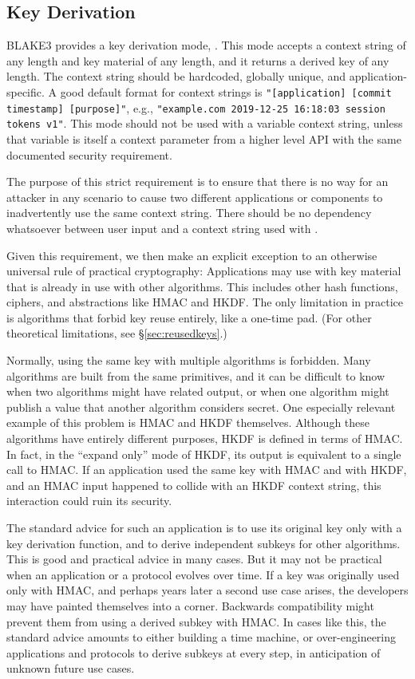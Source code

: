 \documentclass[11pt,notitlepage,a4paper]{article}
\newcommand{\flag}[1]{\texttt{\detokenize{#1}}\xspace}
\begin{document}
\subsection{Key Derivation}\label{sec:kdf}

BLAKE3 provides a key derivation mode, \flag{derive_key}. This mode accepts a
context string of any length and key material of any length, and it returns a
derived key of any length. The context string should be hardcoded, globally
unique, and application-specific. A good default format for context strings is
\texttt{"[application] [commit timestamp] [purpose]"}, e.g.,
\texttt{"example.com 2019-12-25 16:18:03 session tokens v1"}. This mode should
not be used with a variable context string, unless that variable is itself a
context parameter from a higher level API with the same documented security
requirement.

The purpose of this strict requirement is to ensure that there is no way for an
attacker in any scenario to cause two different applications or components to
inadvertently use the same context string. There should be no dependency
whatsoever between user input and a context string used with \flag{derive_key}.

Given this requirement, we then make an explicit exception to an otherwise
universal rule of practical cryptography: Applications may use
\flag{derive_key} with key material that is already in use with other
algorithms. This includes other hash functions, ciphers, and abstractions like
HMAC and HKDF. The only limitation in practice is algorithms that forbid key
reuse entirely, like a one-time pad. (For other theoretical limitations, see
\S\ref{sec:reusedkeys}.)

Normally, using the same key with multiple algorithms is forbidden. Many
algorithms are built from the same primitives, and it can be difficult to know
when two algorithms might have related output, or when one algorithm might
publish a value that another algorithm considers secret. One especially
relevant example of this problem is HMAC and HKDF themselves. Although these
algorithms have entirely different purposes, HKDF is defined in terms of HMAC.
In fact, in the ``expand only'' mode of HKDF, its output is equivalent to a
single call to HMAC. If an application used the same key with HMAC and with
HKDF, and an HMAC input happened to collide with an HKDF context string, this
interaction could ruin its security.

The standard advice for such an application is to use its original key only
with a key derivation function, and to derive independent subkeys for other
algorithms. This is good and practical advice in many cases. But it may not be
practical when an application or a protocol evolves over time. If a key was
originally used only with HMAC, and perhaps years later a second use case
arises, the developers may have painted themselves into a corner. Backwards
compatibility might prevent them from using a derived subkey with HMAC. In
cases like this, the standard advice amounts to either building a time machine,
or over-engineering applications and protocols to derive subkeys at every step,
in anticipation of unknown future use cases.
\end{document}
